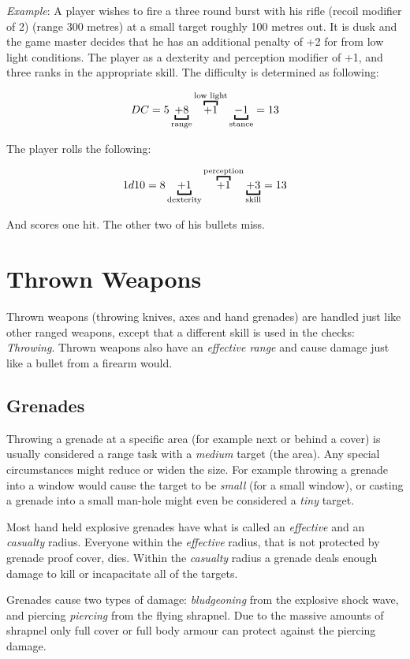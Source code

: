 \emph{Example}: A player wishes to fire a three round burst with his rifle
(recoil modifier of 2) (range 300 metres) at a small target roughly 100 metres
out. It is dusk and the game master decides that he has an additional penalty
of +2 for from low light conditions. The player as a dexterity and perception
modifier of +1, and three ranks in the appropriate skill. The difficulty is
determined as following:

\[
DC = 5 \ub{+ 8}{range} \ob{+ 1}{low light} \ub{- 1}{stance} = 13
\]

The player rolls the following:

\[
1d10 = 8 \ub{+ 1}{dexterity} \ob{+ 1}{perception} \ub{+ 3}{skill} = 13
\]

And scores one hit. The other two of his bullets miss.

\section{Thrown Weapons}
\label{sec:6-Thrown Weapons}

Thrown weapons (throwing knives, axes and hand grenades) are handled just like
other ranged weapons, except that a different skill is used in the checks:
\emph{Throwing}. Thrown weapons also have an \emph{effective range} and cause
damage just like a bullet from a firearm would.

\subsection{Grenades}
\label{sub:6-Grenades}

Throwing a grenade at a specific area (for example next or behind a cover) is
usually considered a range task with a \emph{medium} target (the area). Any
special circumstances might reduce or widen the size. For example throwing a
grenade into a window would cause the target to be \emph{small} (for a small
window), or casting a grenade into a small man-hole might even be considered
a \emph{tiny} target.

Most hand held explosive grenades have what is called an \emph{effective} and
an \emph{casualty} radius. Everyone within the \emph{effective} radius, that is
not protected by grenade proof cover, dies. Within the \emph{casualty} radius
a grenade deals enough damage to kill or incapacitate all of the targets.

Grenades cause two types of damage: \emph{bludgeoning} from the explosive shock
wave, and piercing \emph{piercing} from the flying shrapnel. Due to the massive
amounts of shrapnel only full cover or full body armour can protect against the
piercing damage.

